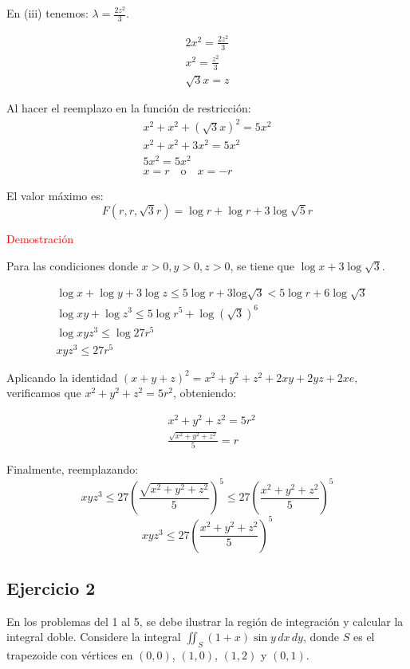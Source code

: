 \documentclass{report}
\begin{document}
En (iii) tenemos: $\lambda = \frac{2z^2}{3}$.

$$
\begin{aligned}
2x^2 = \frac{2z^2}{3} \\
x^2 = \frac{z^2}{3} \\
\sqrt{3}x = z
\end{aligned}
$$

Al hacer el reemplazo en la función de restricción:
$$
\begin{aligned}
x^2 + x^2 + (\sqrt{3}x)^2 = 5x^2 \\
x^2 + x^2 + 3x^2 = 5x^2 \\
5x^2 = 5x^2 \\
x = r \quad \text{o} \quad x = -r
\end{aligned}
$$

El valor máximo es:
$$
F(r, r, \sqrt{3}r) = \log r + \log r + 3 \log \sqrt{5} r 
$$

\textcolor{red}{Demostración}

Para las condiciones donde $x > 0, y > 0, z > 0$, se tiene que $\log x + 3 \log \sqrt{3}$.

$$
\begin{aligned}
& \log x + \log y + 3 \log z \leq 5 \log r + 3 \mathrm{log} \sqrt{3} < 5 \log r + 6 \log \sqrt{3} \\
& \log xy + \log z^3 \leq 5 \log r^5 + \log (\sqrt{3})^6 \\
& \log xyz^3 \leq \log 27r^5\\
& xyz^3 \leq 27r^5
\end{aligned}
$$

Aplicando la identidad $(x+y+z)^2 = x^2+y^2+z^2 + 2xy + 2yz + 2xe,$ verificamos que $x^2 + y^2 + z^2 = 5r^2$, obteniendo:

$$
\begin{aligned}
& x^2 + y^2 + z^2 = 5 r^2 \\
& \frac{\sqrt{x^2 + y^2 + z^2}}{5} = r
\end{aligned}
$$

Finalmente, reemplazando:
$$
xyz^3 \leq 27 \left(\frac{\sqrt{x^2 + y^2 + z^2}}{5}\right)^5 \leq 27 \left(\frac{x^2 + y^2 + z^2}{5}\right)^5
$$
$$
xyz^3 \leq 27 \left(\frac{x^2 + y^2 + z^2}{5}\right)^5
$$\subsection{Ejercicio 2}
En los problemas del 1 al 5, se debe ilustrar la región de integración y calcular la integral doble. Considere la integral $\iint_{S} (1+x) \sin y \, dx \, dy$, donde $S$ es el trapezoide con vértices en $(0,0)$, $(1,0)$, $(1,2)$ y $(0,1)$.
\end{document}
